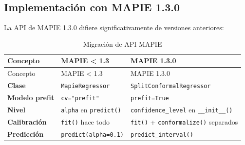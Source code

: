 \documentclass[
  spanish,
  11pt,
  letterpaper,
]{scrbook}
\theoremstyle{plain}
\theoremstyle{remark}
\begin{document}
\subsection{Implementación con MAPIE
1.3.0}\label{sec-mapie-implementation}

La API de MAPIE 1.3.0 difiere significativamente de versiones
anteriores:

\begin{longtable}[]{@{}
  >{\raggedright\arraybackslash}p{}
  >{\raggedright\arraybackslash}p{}
  >{\raggedright\arraybackslash}p{}@{}}
\caption{Migración de API MAPIE}\label{tbl-mapie-api}\tabularnewline
\toprule\noalign{}
\begin{minipage}[b]{\linewidth}\raggedright
Concepto
\end{minipage} & \begin{minipage}[b]{\linewidth}\raggedright
MAPIE \textless{} 1.3
\end{minipage} & \begin{minipage}[b]{\linewidth}\raggedright
MAPIE 1.3.0
\end{minipage} \\
\midrule\noalign{}
\endfirsthead
\toprule\noalign{}
\begin{minipage}[b]{\linewidth}\raggedright
Concepto
\end{minipage} & \begin{minipage}[b]{\linewidth}\raggedright
MAPIE \textless{} 1.3
\end{minipage} & \begin{minipage}[b]{\linewidth}\raggedright
MAPIE 1.3.0
\end{minipage} \\
\midrule\noalign{}
\endhead
\bottomrule\noalign{}
\endlastfoot
\textbf{Clase} & \texttt{MapieRegressor} &
\texttt{SplitConformalRegressor} \\
\textbf{Modelo prefit} & \texttt{cv="prefit"} & \texttt{prefit=True} \\
\textbf{Nivel} & \texttt{alpha} en \texttt{predict()} &
\texttt{confidence\_level} en \texttt{\_\_init\_\_()} \\
\textbf{Calibración} & \texttt{fit()} hace todo & \texttt{fit()} +
\texttt{conformalize()} separados \\
\textbf{Predicción} & \texttt{predict(alpha=0.1)} &
\texttt{predict\_interval()} \\
\end{longtable}
\end{document}
